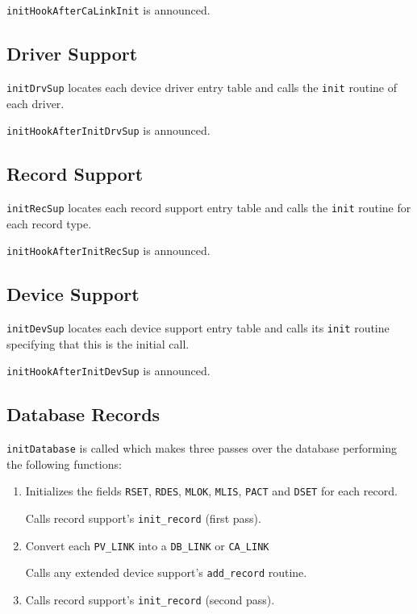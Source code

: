 \verb|initHookAfterCaLinkInit| is announced.

\subsection{Driver Support}

\verb|initDrvSup| locates each device driver entry table and calls the \verb|init| routine of each driver.

\verb|initHookAfterInitDrvSup| is announced.

\subsection{Record Support}

\verb|initRecSup| locates each record support entry table and calls the \verb|init| routine for each record type.

\verb|initHookAfterInitRecSup| is announced.

\subsection{Device Support}

\verb|initDevSup| locates each device support entry table and calls its \verb|init| routine specifying that this is the initial call.

\verb|initHookAfterInitDevSup| is announced.

\subsection{Database Records}

\verb|initDatabase| is called which makes three passes over the database performing the following functions:

\begin{enumerate}

\item Initializes the fields \verb|RSET|, \verb|RDES|, \verb|MLOK|, \verb|MLIS|, \verb|PACT| and \verb|DSET| for each record.

Calls record support's \verb|init_record| (first pass).

\item Convert each \verb|PV_LINK| into a \verb|DB_LINK| or \verb|CA_LINK|

Calls any extended device support's \verb|add_record| routine.

\item Calls record support's \verb|init_record| (second pass).
\end{enumerate}

